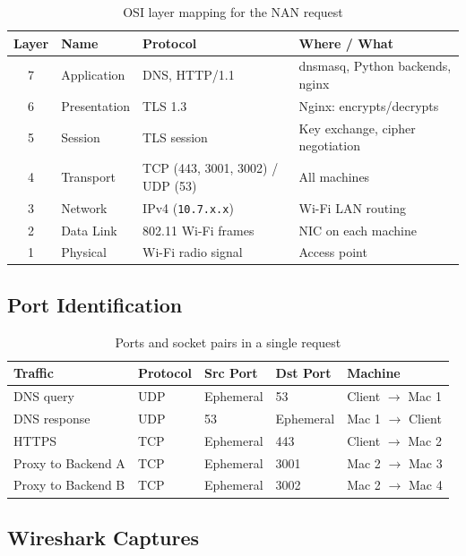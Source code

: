 \documentclass[12pt,a4paper]{article}
\begin{document}
\begin{table}[h!]
\centering
\caption{OSI layer mapping for the NAN request}
\begin{tabular}{cllp{5cm}}
\toprule
\textbf{Layer} & \textbf{Name} & \textbf{Protocol} & \textbf{Where / What} \\
\midrule
7 & Application & DNS, HTTP/1.1 & dnsmasq, Python backends, nginx \\
6 & Presentation & TLS 1.3 & Nginx: encrypts/decrypts \\
5 & Session & TLS session & Key exchange, cipher negotiation \\
4 & Transport & TCP (443, 3001, 3002) / UDP (53) & All machines \\
3 & Network & IPv4 (\texttt{10.7.x.x}) & Wi-Fi LAN routing \\
2 & Data Link & 802.11 Wi-Fi frames & NIC on each machine \\
1 & Physical & Wi-Fi radio signal & Access point \\
\bottomrule
\end{tabular}
\end{table}

\subsection{Port Identification}

\begin{table}[h!]
\centering
\caption{Ports and socket pairs in a single request}
\begin{tabular}{lllll}
\toprule
\textbf{Traffic} & \textbf{Protocol} & \textbf{Src Port} & \textbf{Dst Port} & \textbf{Machine} \\
\midrule
DNS query & UDP & Ephemeral & 53 & Client $\rightarrow$ Mac 1 \\
DNS response & UDP & 53 & Ephemeral & Mac 1 $\rightarrow$ Client \\
HTTPS & TCP & Ephemeral & 443 & Client $\rightarrow$ Mac 2 \\
Proxy to Backend A & TCP & Ephemeral & 3001 & Mac 2 $\rightarrow$ Mac 3 \\
Proxy to Backend B & TCP & Ephemeral & 3002 & Mac 2 $\rightarrow$ Mac 4 \\
\bottomrule
\end{tabular}
\end{table}

\subsection{Wireshark Captures}
\end{document}
